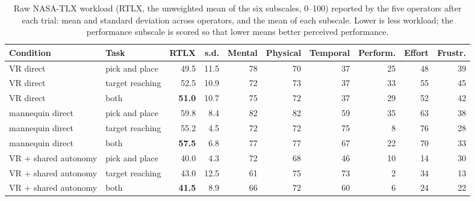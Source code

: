\begin{table}[htbp]
  \centering
  \footnotesize
  \caption[NASA-TLX workload by condition and task]{Raw NASA-TLX workload
  (RTLX, the unweighted mean of the six subscales, 0--100) reported by the
  five operators after each trial: mean and standard deviation across
  operators, and the mean of each subscale. Lower is less workload; the
  performance subscale is scored so that lower means better perceived
  performance.}
  \label{tab:tlx}
  \begin{tabular}{p{3.9cm}p{2.5cm}rrrrrrrr}
    \toprule
    Condition & Task & RTLX & s.d. & Mental & Physical & Temporal & Perform. & Effort & Frustr. \\
    \midrule
    VR direct & pick and place & 49.5 & 11.5 & 78 & 70 & 37 & 25 & 48 & 39 \\
    VR direct & target reaching & 52.5 & 10.9 & 72 & 73 & 37 & 33 & 55 & 45 \\
    VR direct & both & \textbf{51.0} & 10.7 & 75 & 72 & 37 & 29 & 52 & 42 \\
    \addlinespace
    mannequin direct & pick and place & 59.8 & 8.4 & 82 & 82 & 59 & 35 & 63 & 38 \\
    mannequin direct & target reaching & 55.2 & 4.5 & 72 & 72 & 75 & 8 & 76 & 28 \\
    mannequin direct & both & \textbf{57.5} & 6.8 & 77 & 77 & 67 & 22 & 70 & 33 \\
    \addlinespace
    VR + shared autonomy & pick and place & 40.0 & 4.3 & 72 & 68 & 46 & 10 & 14 & 30 \\
    VR + shared autonomy & target reaching & 43.0 & 12.5 & 61 & 75 & 73 & 2 & 34 & 13 \\
    VR + shared autonomy & both & \textbf{41.5} & 8.9 & 66 & 72 & 60 & 6 & 24 & 22 \\
    \bottomrule
  \end{tabular}
\end{table}
